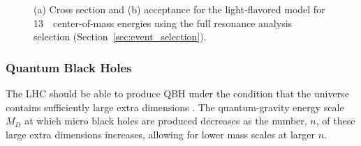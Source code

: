\begin{figure}[!htb]
  \centering
  \caption{(a) Cross section and (b) acceptance for the 
  light-flavored \qstar model for 13~\TeV~center-of-mass energies using the full resonance
  analysis selection (Section~\ref{sec:event_selection}).}
\end{figure}


\clearpage

\subsubsection{Quantum Black Holes}
\label{sec:QBH}
The LHC should be able to produce QBH under the condition that the
universe contains sufficiently large extra dimensions \cite{RandallMeade}.
The quantum-gravity energy scale $M_{D}$ at which micro black holes are produced decreases as the number, $n$,
of these large extra dimensions increases, allowing for lower mass scales at larger $n$.

